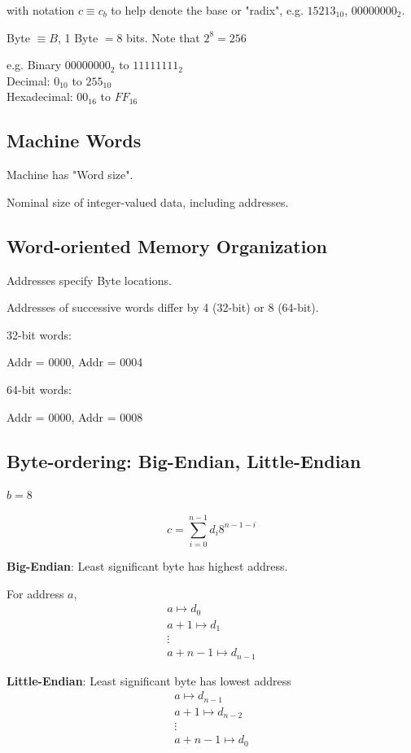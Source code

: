 \documentclass[10pt]{amsart}
\begin{document}
\begin{multicols*}{2}
with notation $c \equiv c_b$ to help denote the base or "radix", e.g. $15213_{10}$, $00000000_2$.

Byte $\equiv B$, 1 Byte $ = 8$ bits. Note that $2^8 = 256$

e.g. Binary $00000000_2$ to $11111111_2$ \\
Decimal: $0_{10}$ to $255_{10}$ \\
Hexadecimal: $00_{16}$ to $FF_{16}$

\subsection{Machine Words}

Machine has "Word size".

Nominal size of integer-valued data, including addresses.

\subsection{Word-oriented Memory Organization}

Addresses specify Byte locations. 

Addresses of successive words differ by 4 (32-bit) or 8 (64-bit).

32-bit words:

Addr = 0000, Addr = 0004

64-bit words:

Addr = 0000, Addr = 0008

\subsection{Byte-ordering: Big-Endian, Little-Endian}

$b = 8$

\begin{equation}
c = \sum_{i=0}^{n-1} d_i 8^{n-1 -i}
\end{equation}

\textbf{Big-Endian}: Least significant byte has highest address.

For address $a$, 
\[
\begin{gathered}
	a \mapsto d_0 \\
	a+1 \mapsto d_1 \\
\vdots \\
a+n-1 \mapsto d_{n-1}
\end{gathered}
\]

\textbf{Little-Endian}: Least significant byte has lowest address
\[
\begin{gathered}
a \mapsto d_{n-1}  \\
a+1 \mapsto d_{n-2} \\
\vdots \\
a+n -1 \mapsto d_0
\end{gathered}
\]


\end{multicols*}
\end{document}
